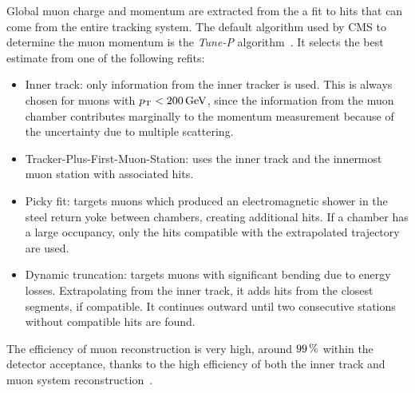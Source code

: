 Global muon charge and momentum are extracted from the a fit to hits that can come from the entire tracking system.
The default algorithm used by CMS to determine the muon momentum is the \textit{Tune-P} algorithm~\cite{CMS-MUO-10-004}.
It selects the best estimate from one of the following refits:
\begin{itemize}
\item Inner track: only information from the inner tracker is used.
  This is always chosen for muons with $p_{\mathrm{T}} < 200\,\text{Ge\hspace{-.08em}V}$, since the information from the muon chamber
  contributes marginally to the momentum measurement because of the uncertainty due to multiple scattering.
\item Tracker-Plus-First-Muon-Station: uses the inner track and the innermost muon station with associated hits.
\item Picky fit: targets muons which produced an electromagnetic shower in the steel return yoke between chambers, creating additional hits.
  If a chamber has a large occupancy, only the hits compatible with the extrapolated trajectory are used.
\item Dynamic truncation: targets muons with significant bending due to energy losses.
  Extrapolating from the inner track, it adds hits from the closest segments, if compatible.
  It continues outward until two consecutive stations without compatible hits are found.
\end{itemize}

The efficiency of muon reconstruction is very high, around $99\usep\%$ within the detector acceptance,
thanks to the high efficiency of both the inner track and muon system reconstruction~\cite{CMS-MUO-16-001}.
